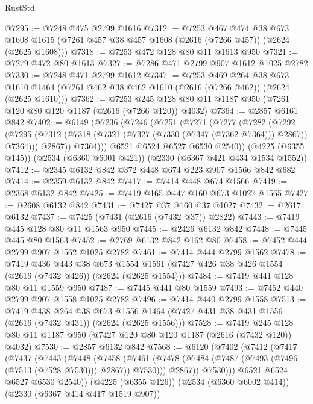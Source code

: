\begin{lexlean}{RustStd}
\begin{coremodule}
@7295 := @7248 @475 @2799 @1616
@7312 := @7253
    @467
    @474
    @38
    @673
    @1608
    @1615
    (@7261 @457 @38 @457 @1608 (@2616 (@7266 @457)) (@2624 (@2625 @1608)))
@7318 := @7253 @472 @128 @80 @11 @1613 @950
@7321 := @7279 @472 @80 @1613
@7327 := @7286 @471 @2799 @907 @1612 @1025 @2782
@7330 := @7248 @471 @2799 @1612
@7347 := @7253
    @469
    @264
    @38
    @673
    @1610
    @1464
    (@7261 @462 @38 @462 @1610 (@2616 (@7266 @462)) (@2624 (@2625 @1610)))
@7362 := @7253 @245 @128 @80 @11 @1187 @950 (@7261 @120 @80 @120 @1187 (@2616 (@7266 @120)) @4032)
@7364 := @2857 @6161 @842
@7402 := @6149
    (@7236
      (@7246
        (@7251
          (@7271
            (@7277
              (@7282
                (@7292
                  (@7295 (@7312 (@7318 (@7321 (@7327 (@7330 (@7347 (@7362 @7364))) @2867)) @7364)))
                  @2867))
              @7364)))
        @6521
        @6524
        @6527
        @6530
        @2540))
    (@4225 (@6355 @145))
    (@2534 (@6360 @6001 @421))
    (@2330 (@6367 @421 @434 @1534 @1552))
@7412 := @2345 @6132 @842 @372 @448 @674 @223 @907 @1566 @842 @682
@7414 := @2359 @6132 @842
@7417 := @7414 @448 @674 @1566
@7419 := @2368 @6132 @842
@7425 := @7419 @165 @447 @160 @673 @1027 @1565
@7427 := @2608 @6132 @842
@7431 := @7427 @37 @160 @37 @1027
@7432 := @2617 @6132
@7437 := @7425 (@7431 (@2616 (@7432 @37)) @2822)
@7443 := @7419 @445 @128 @80 @11 @1563 @950
@7445 := @2426 @6132 @842
@7448 := @7445 @445 @80 @1563
@7452 := @2769 @6132 @842 @162 @80
@7458 := @7452 @444 @2799 @907 @1562 @1025 @2782
@7461 := @7414 @444 @2799 @1562
@7478 := @7419
    @436
    @443
    @38
    @673
    @1554
    @1561
    (@7427 @426 @38 @426 @1554 (@2616 (@7432 @426)) (@2624 (@2625 @1554)))
@7484 := @7419 @441 @128 @80 @11 @1559 @950
@7487 := @7445 @441 @80 @1559
@7493 := @7452 @440 @2799 @907 @1558 @1025 @2782
@7496 := @7414 @440 @2799 @1558
@7513 := @7419
    @438
    @264
    @38
    @673
    @1556
    @1464
    (@7427 @431 @38 @431 @1556 (@2616 (@7432 @431)) (@2624 (@2625 @1556)))
@7528 := @7419 @245 @128 @80 @11 @1187 @950 (@7427 @120 @80 @120 @1187 (@2616 (@7432 @120)) @4032)
@7530 := @2857 @6132 @842
@7568 := @6120
    (@7402
      (@7412
        (@7417
          (@7437
            (@7443
              (@7448
                (@7458
                  (@7461 (@7478 (@7484 (@7487 (@7493 (@7496 (@7513 (@7528 @7530))) @2867)) @7530)))
                  @2867))
              @7530)))
        @6521
        @6524
        @6527
        @6530
        @2540))
    (@4225 (@6355 @126))
    (@2534 (@6360 @6002 @414))
    (@2330 (@6367 @414 @417 @1519 @907))

\end{coremodule}
\end{lexlean}
